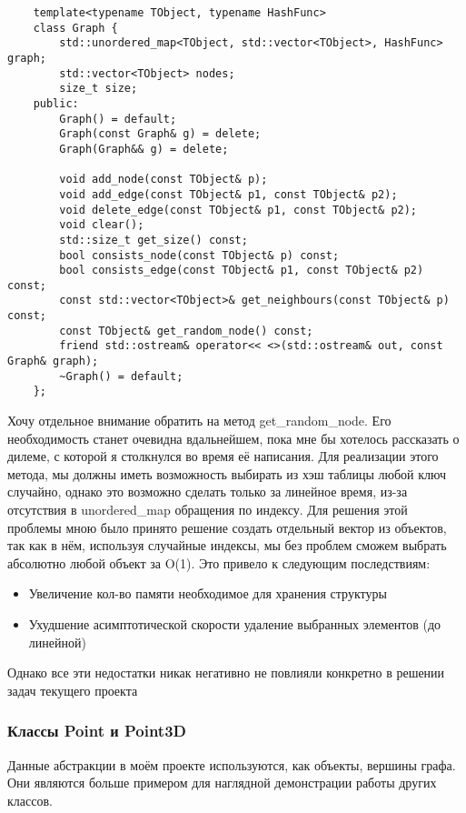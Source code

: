 \begin{verbatim}
    template<typename TObject, typename HashFunc>
    class Graph {
        std::unordered_map<TObject, std::vector<TObject>, HashFunc> graph;
        std::vector<TObject> nodes;
        size_t size;
    public:
        Graph() = default;
        Graph(const Graph& g) = delete;
        Graph(Graph&& g) = delete;

        void add_node(const TObject& p);
        void add_edge(const TObject& p1, const TObject& p2);
        void delete_edge(const TObject& p1, const TObject& p2);
        void clear();
        std::size_t get_size() const;
        bool consists_node(const TObject& p) const;
        bool consists_edge(const TObject& p1, const TObject& p2) const;
        const std::vector<TObject>& get_neighbours(const TObject& p) const;
        const TObject& get_random_node() const;
        friend std::ostream& operator<< <>(std::ostream& out, const Graph& graph);
        ~Graph() = default;
    };
\end{verbatim}
Хочу отдельное внимание обратить на метод get\_random\_node. Его необходимость 
станет очевидна вдальнейшем, пока мне бы хотелось рассказать о дилеме, с которой я столкнулся
во время её написания. Для реализации этого метода, мы должны иметь возможность выбирать из хэш таблицы
любой ключ случайно, однако это возможно сделать только за линейное время, из-за отсутствия в 
unordered\_map обращения по индексу. Для решения этой проблемы мною было принято решение создать отдельный
вектор из объектов, так как в нём, используя случайные индексы, мы без проблем сможем выбрать 
абсолютно любой объект за O(1). 
Это привело к следующим последствиям:
\begin{itemize}
    \item Увеличение кол-во памяти необходимое для хранения структуры
    \item Ухудшение асимптотической скорости удаление выбранных элементов (до линейной)
\end{itemize}
Однако все эти недостатки никак негативно не повлияли конкретно в решении задач текущего проекта 


\subsubsection{Классы Point и Point3D}

Данные абстракции в моём проекте используются, как объекты, вершины графа. 
Они являются больше примером для наглядной демонстрации работы других классов.

